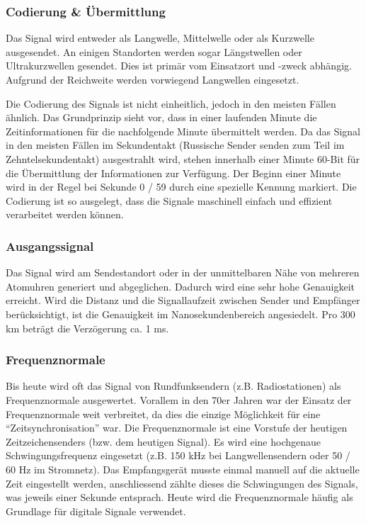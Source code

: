 \subsubsection{Codierung \& Übermittlung}
Das Signal wird entweder als Langwelle, Mittelwelle oder als Kurzwelle ausgesendet. An einigen Standorten werden sogar Längstwellen oder Ultrakurzwellen gesendet. Dies ist primär vom Einsatzort und -zweck abhängig. Aufgrund der Reichweite werden vorwiegend Langwellen eingesetzt.

Die Codierung des Signals ist nicht einheitlich, jedoch in den meisten Fällen ähnlich. Das Grundprinzip sieht vor, dass in einer laufenden Minute die Zeitinformationen für die nachfolgende Minute übermittelt werden. Da das Signal in den meisten Fällen im Sekundentakt (Russische Sender senden zum Teil im Zehntelsekundentakt) ausgestrahlt wird, stehen innerhalb einer Minute 60-Bit für die Übermittlung der Informationen zur Verfügung. Der Beginn einer Minute wird in der Regel bei Sekunde 0 / 59 durch eine spezielle Kennung markiert. Die Codierung ist so ausgelegt, dass die Signale maschinell einfach und effizient verarbeitet werden können.

\subsubsection{Ausgangssignal}
Das Signal wird am Sendestandort oder in der unmittelbaren Nähe von mehreren Atomuhren generiert und abgeglichen. Dadurch wird eine sehr hohe Genauigkeit erreicht. Wird die Distanz und die Signallaufzeit zwischen Sender und Empfänger berücksichtigt, ist die Genauigkeit im Nanosekundenbereich angesiedelt. Pro 300 km beträgt die Verzögerung ca. 1 ms.

\subsubsection{Frequenznormale} \label{subsubsec:Analyse:Frequenznormale}
Bis heute wird oft das Signal von Rundfunksendern (z.B. Radiostationen) als Frequenznormale ausgewertet. Vorallem in den 70er Jahren war der Einsatz der Frequenznormale weit verbreitet, da dies die einzige Möglichkeit für eine "`Zeitsynchronisation"' war. Die Frequenznormale ist eine Vorstufe der heutigen Zeitzeichensenders (bzw. dem heutigen Signal). Es wird eine hochgenaue Schwingungsfrequenz eingesetzt (z.B. 150 kHz bei Langwellensendern oder 50 / 60 Hz im Stromnetz). Das Empfangsgerät musste einmal manuell auf die aktuelle Zeit eingestellt werden, anschliessend zählte dieses die Schwingungen des Signals, was jeweils einer Sekunde entsprach. Heute wird die Frequenznormale häufig als Grundlage für digitale Signale verwendet. 

